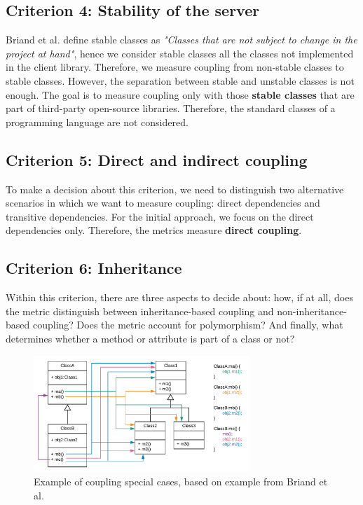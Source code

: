 \documentclass[a4paper]{article}
\begin{document}
\subsection{Criterion 4: Stability of the server}
Briand et al. \cite{briand1999unified} define stable classes as \textit{"Classes that are not subject to change in the project at hand"}, hence we consider stable classes all the classes not implemented in the client library. Therefore, we measure coupling from non-stable classes to stable classes.
However, the separation between stable and unstable classes is not enough. The goal is to measure coupling only with those \textbf{stable classes} that are part of third-party open-source libraries. Therefore, the standard classes of a programming language are not considered.

\subsection{Criterion 5: Direct and indirect coupling}
To make a decision about this criterion, we need to distinguish two alternative scenarios in which we want to measure coupling: direct dependencies and transitive dependencies. For the initial approach, we  focus on the direct dependencies only. Therefore, the metrics measure \textbf{direct coupling}.

\subsection{Criterion 6: Inheritance}
Within this criterion, there are three aspects to decide about: how, if at all, does the metric distinguish between inheritance-based coupling and non-inheritance-based coupling? Does the metric account for polymorphism? And finally, what determines whether a method or attribute is part of a class or not?

\begin{figure}[ht]
\begin{center}
\includegraphics[height=4.4cm]{img/specialcases.png}
\caption{Example of coupling special cases, based on example from Briand et al. \cite{briand1999unified}}
\label{fig:specialcases}
\end{center}
\end{figure}
\end{document}
